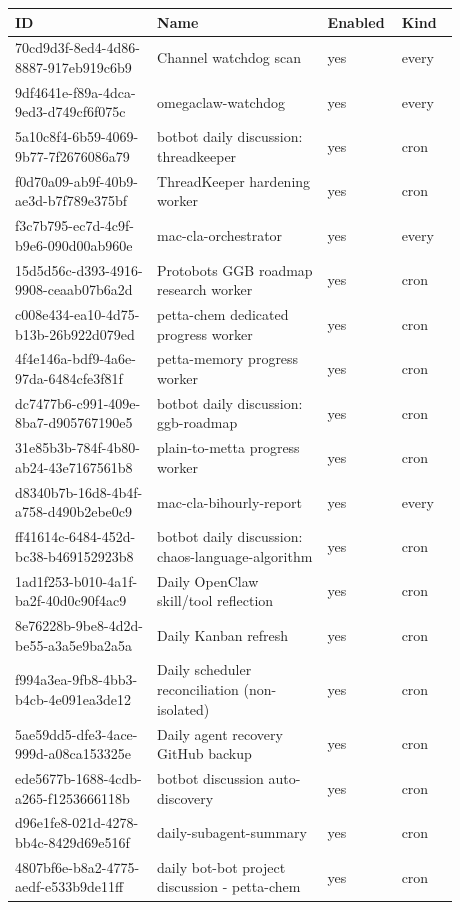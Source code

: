 \documentclass[11pt]{article}
\begin{document}
\begin{longtable}{p{0.30\linewidth}p{0.36\linewidth}p{0.10\linewidth}p{0.12\linewidth}}
\textbf{ID} & \textbf{Name} & \textbf{Enabled} & \textbf{Kind} \\\hline
70cd9d3f-8ed4-4d86-8887-917eb919c6b9 & Channel watchdog scan & yes & every \\
9df4641e-f89a-4dca-9ed3-d749cf6f075c & omegaclaw-watchdog & yes & every \\
5a10c8f4-6b59-4069-9b77-7f2676086a79 & botbot daily discussion: threadkeeper & yes & cron \\
f0d70a09-ab9f-40b9-ae3d-b7f789e375bf & ThreadKeeper hardening worker & yes & cron \\
f3c7b795-ec7d-4c9f-b9e6-090d00ab960e & mac-cla-orchestrator & yes & every \\
15d5d56c-d393-4916-9908-ceaab07b6a2d & Protobots GGB roadmap research worker & yes & cron \\
c008e434-ea10-4d75-b13b-26b922d079ed & petta-chem dedicated progress worker & yes & cron \\
4f4e146a-bdf9-4a6e-97da-6484cfe3f81f & petta-memory progress worker & yes & cron \\
dc7477b6-c991-409e-8ba7-d905767190e5 & botbot daily discussion: ggb-roadmap & yes & cron \\
31e85b3b-784f-4b80-ab24-43e7167561b8 & plain-to-metta progress worker & yes & cron \\
d8340b7b-16d8-4b4f-a758-d490b2ebe0c9 & mac-cla-bihourly-report & yes & every \\
ff41614c-6484-452d-bc38-b469152923b8 & botbot daily discussion: chaos-language-algorithm & yes & cron \\
1ad1f253-b010-4a1f-ba2f-40d0c90f4ac9 & Daily OpenClaw skill/tool reflection & yes & cron \\
8e76228b-9be8-4d2d-be55-a3a5e9ba2a5a & Daily Kanban refresh & yes & cron \\
f994a3ea-9fb8-4bb3-b4cb-4e091ea3de12 & Daily scheduler reconciliation (non-isolated) & yes & cron \\
5ae59dd5-dfe3-4ace-999d-a08ca153325e & Daily agent recovery GitHub backup & yes & cron \\
ede5677b-1688-4cdb-a265-f1253666118b & botbot discussion auto-discovery & yes & cron \\
d96e1fe8-021d-4278-bb4c-8429d69e516f & daily-subagent-summary & yes & cron \\
4807bf6e-b8a2-4775-aedf-e533b9de11ff & daily bot-bot project discussion - petta-chem & yes & cron \\

\end{longtable}
\end{document}
